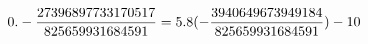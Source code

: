 \documentclass[preview]{standalone}
\begin{document}
\begin{align*}
\special{dvisvgm:raw <g id='unique000'>}0.- \frac{27396897733170517}{825659931684591} = 5.8 (- \frac{3940649673949184}{825659931684591}) - 10\special{dvisvgm:raw </g>}
\end{align*}
\end{document}
